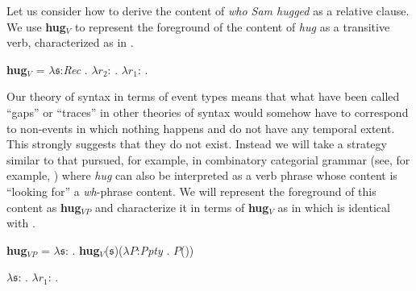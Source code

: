 Let us consider how to derive the content of \textit{who Sam hugged}
as a relative clause.  We use \textbf{hug}$_V$ to represent the
foreground of the content of \textit{hug} as a transitive verb,
characterized as in \nexteg{}.
\begin{ex} 
\textbf{hug}$_V$ = $\lambda\mathfrak{s}$:\textit{Rec} . $\lambda
r_2$: . $\lambda
r_1$:
.  
\end{ex} 
Our theory of syntax in terms of event types means that what have been
called ``gaps'' or ``traces'' in other theories of syntax would
somehow have to correspond to non-events in which nothing happens and
do not have any temporal extent.  This strongly suggests that they do
not exist.  Instead we will take a strategy similar to that pursued,
for example, in combinatory categorial grammar (see, for example,
\citealp{Steedman2012}) where \textit{hug} can also be interpreted as
a verb phrase whose content is ``looking for'' a \textit{wh}-phrase
content.  We will represent the foreground of this content as
\textbf{hug}$_{\mathit{VP}}$ and characterize it in terms of
\textbf{hug}$_V$ as in  which is identical with .
\begin{ex} 
\begin{subex}
\item \textbf{hug}$_{\mathit{VP}}$ = $\lambda\mathfrak{s}$:
. \textbf{hug}$_V$($\mathfrak{s}$)($\lambda P$:\textit{Ppty}
. $P$()) 

\item
  $\lambda\mathfrak{s}$:
  . $\lambda r_1$:
  . 
\end{subex}
\end{ex}

